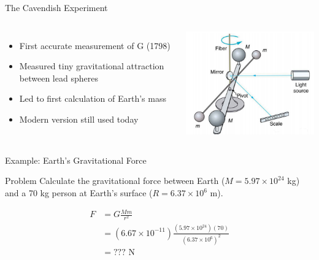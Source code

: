 \documentclass{beamer}
\begin{document}
\begin{frame}{The Cavendish Experiment}
    \begin{columns}
        \begin{itemize}
            \item First accurate measurement of G (1798)
            \item Measured tiny gravitational attraction between lead spheres
            \item Led to first calculation of Earth's mass
            \item Modern version still used today
        \end{itemize}
        \includegraphics[width=\textwidth]{phys12-gravity-cavendish-experiment.png}
    \end{columns}
\end{frame}

\begin{frame}{Example: Earth's Gravitational Force}
    \begin{block}{Problem}
        Calculate the gravitational force between Earth ($M = 5.97 \times 10^{24}$ kg) and a 70 kg person at Earth's surface ($R = 6.37 \times 10^6$ m).
    \end{block}
    \begin{solution}
        \begin{align*}
            F &= G\frac{Mm}{r^2} \\
            &= (6.67 \times 10^{-11})\frac{(5.97 \times 10^{24})(70)}{(6.37 \times 10^6)^2} \\
            &= ??? \text{ N}
        \end{align*}
    \end{solution}
\end{frame}
\end{document}
